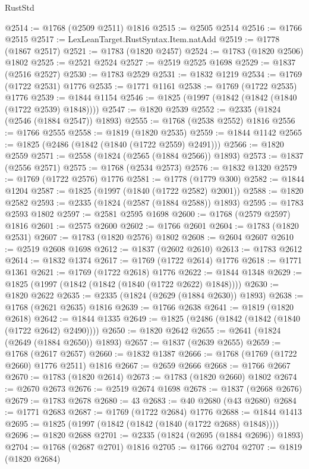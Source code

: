 \begin{lexlean}{RustStd}
\begin{coremodule}
@2514 := @1768 (@2509 @2511) @1816
@2515 := @2505 @2514
@2516 := @1766 @2515
@2517 := LexLeanTarget.RustSyntax.Item.natAdd
@2519 := @1778 (@1867 @2517)
@2521 := @1783 (@1820 @2457)
@2524 := @1783 (@1820 @2506) @1802
@2525 := @2521 @2524
@2527 := @2519 @2525 @1698
@2529 := @1837 (@2516 @2527)
@2530 := @1783 @2529
@2531 := @1832 @1219
@2534 := @1769 (@1722 @2531) @1776
@2535 := @1771 @1161
@2538 := @1769 (@1722 @2535) @1776
@2539 := @1844 @1154
@2546 := @1825 (@1997 (@1842 (@1842 (@1840 (@1722 @2539) @1848))))
@2547 := @1820 @2539
@2552 := @2335 (@1824 (@2546 (@1884 @2547)) @1893)
@2555 := @1768 (@2538 @2552) @1816
@2556 := @1766 @2555
@2558 := @1819 (@1820 @2535)
@2559 := @1844 @1142
@2565 := @1825 (@2486 (@1842 (@1840 (@1722 @2559) @2491)))
@2566 := @1820 @2559
@2571 := @2558 (@1824 (@2565 (@1884 @2566)) @1893)
@2573 := @1837 (@2556 @2571)
@2575 := @1768 (@2534 @2573)
@2576 := @1832 @1320
@2579 := @1769 (@1722 @2576) @1776
@2581 := @1778 (@1779 @300)
@2582 := @1844 @1204
@2587 := @1825 (@1997 (@1840 (@1722 @2582) @2001))
@2588 := @1820 @2582
@2593 := @2335 (@1824 (@2587 (@1884 @2588)) @1893)
@2595 := @1783 @2593 @1802
@2597 := @2581 @2595 @1698
@2600 := @1768 (@2579 @2597) @1816
@2601 := @2575 @2600
@2602 := @1766 @2601
@2604 := @1783 (@1820 @2531)
@2607 := @1783 (@1820 @2576) @1802
@2608 := @2604 @2607
@2610 := @2519 @2608 @1698
@2612 := @1837 (@2602 @2610)
@2613 := @1783 @2612
@2614 := @1832 @1374
@2617 := @1769 (@1722 @2614) @1776
@2618 := @1771 @1361
@2621 := @1769 (@1722 @2618) @1776
@2622 := @1844 @1348
@2629 := @1825 (@1997 (@1842 (@1842 (@1840 (@1722 @2622) @1848))))
@2630 := @1820 @2622
@2635 := @2335 (@1824 (@2629 (@1884 @2630)) @1893)
@2638 := @1768 (@2621 @2635) @1816
@2639 := @1766 @2638
@2641 := @1819 (@1820 @2618)
@2642 := @1844 @1335
@2649 := @1825 (@2486 (@1842 (@1842 (@1840 (@1722 @2642) @2490))))
@2650 := @1820 @2642
@2655 := @2641 (@1824 (@2649 (@1884 @2650)) @1893)
@2657 := @1837 (@2639 @2655)
@2659 := @1768 (@2617 @2657)
@2660 := @1832 @1387
@2666 := @1768 (@1769 (@1722 @2660) @1776 @2511) @1816
@2667 := @2659 @2666
@2668 := @1766 @2667
@2670 := @1783 (@1820 @2614)
@2673 := @1783 (@1820 @2660) @1802
@2674 := @2670 @2673
@2676 := @2519 @2674 @1698
@2678 := @1837 (@2668 @2676)
@2679 := @1783 @2678
@2680 := 43
@2683 := @40 @2680 (@43 @2680)
@2684 := @1771 @2683
@2687 := @1769 (@1722 @2684) @1776
@2688 := @1844 @1413
@2695 := @1825 (@1997 (@1842 (@1842 (@1840 (@1722 @2688) @1848))))
@2696 := @1820 @2688
@2701 := @2335 (@1824 (@2695 (@1884 @2696)) @1893)
@2704 := @1768 (@2687 @2701) @1816
@2705 := @1766 @2704
@2707 := @1819 (@1820 @2684)

\end{coremodule}
\end{lexlean}
